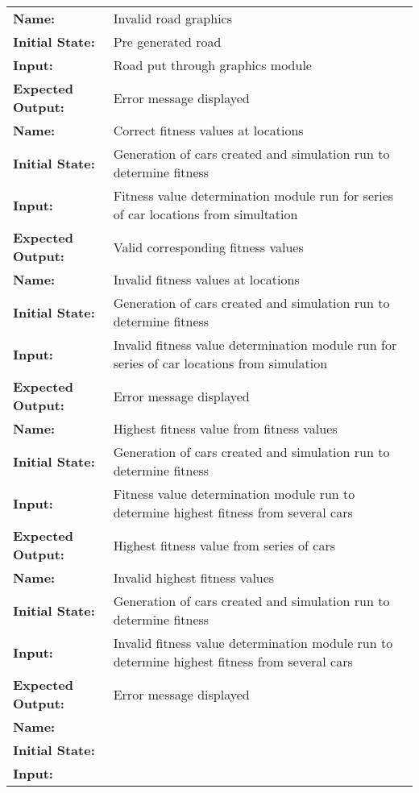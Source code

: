 \documentclass[12pt, titlepage]{article}
\begin{document}
\begin{center}
\begin{longtable}{ l | p{10cm} }
\hline
\rule{0pt}{1.5em}\textbf{Name:} & Invalid road graphics\\
\textbf{Initial State:} & Pre generated road\\
\textbf{Input:} & Road put through graphics module\\
\textbf{Expected Output:} & Error message displayed\\[0.6em]
\hline
\rule{0pt}{1.5em}\textbf{Name:} & Correct fitness values at locations\\
\textbf{Initial State:} & Generation of cars created and simulation run to determine fitness\\
\textbf{Input:} & Fitness value determination module run for series of car locations from simultation\\
\textbf{Expected Output:} & Valid corresponding fitness values\\[0.6em]
\hline
\rule{0pt}{1.5em}\textbf{Name:} & Invalid fitness values at locations\\
\textbf{Initial State:} & Generation of cars created and simulation run to determine fitness\\
\textbf{Input:} & Invalid fitness value determination module run for series of car locations from simulation\\
\textbf{Expected Output:} & Error message displayed\\[0.6em]
\hline
\rule{0pt}{1.5em}\textbf{Name:} & Highest fitness value from fitness values\\
\textbf{Initial State:} & Generation of cars created and simulation run to determine fitness\\
\textbf{Input:} & Fitness value determination module run to determine highest fitness from several cars\\
\textbf{Expected Output:} & Highest fitness value from series of cars\\[0.6em]
\hline
\rule{0pt}{1.5em}\textbf{Name:} & Invalid highest fitness values\\
\textbf{Initial State:} & Generation of cars created and simulation run to determine fitness\\
\textbf{Input:} & Invalid fitness value determination module run to determine highest fitness from several cars\\
\textbf{Expected Output:} & Error message displayed\\[0.6em]
\hline
\rule{0pt}{1.5em}\textbf{Name:} & \\
\textbf{Initial State:} & \\
\textbf{Input:} & \\

\end{longtable}
\end{center}
\end{document}
